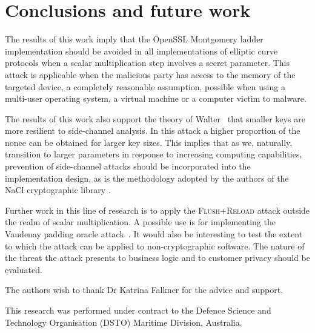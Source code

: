 \documentclass[twocolumn]{svjour3}
\newcommand{\starpar}[1]{\par{\footnotesize $\star$ \hl{#1}\par}}
\newcommand{\fl}{\textsc{Flu\-sh+\allowbreak Re\-load}\xspace}
\begin{document}
\section{Conclusions and future work}
The results of this work imply that the OpenSSL Montgomery ladder implementation should be avoided in 
all implementations of elliptic curve protocols when a scalar multiplication step involves a secret parameter. 
This attack is applicable when the malicious party has access to the memory of the targeted device, 
a completely reasonable assumption, possible when using a multi-user operating system, a virtual machine or a computer victim to malware. 

The results of this work also support the theory of Walter~\cite{walter04longer} that smaller keys are more resilient to side-channel analysis.
In this attack a higher proportion of the nonce can be obtained for larger key sizes. 
This implies that as we, naturally, transition to larger parameters in response to increasing computing capabilities, 
prevention of side-channel attacks should be incorporated into the implementation design, 
as is the methodology adopted by the authors of the NaCl cryptographic library \cite{dan-tan-peter}. 

Further work in this line of research is to apply the \fl attack outside the realm of scalar multiplication.
A possible use is for implementing the Vaudenay padding oracle attack~\cite{alfardan12plaintext,vaudenay02security}.
It would also be interesting to test the extent to which the attack can be applied to non-cryptographic software.
The nature of the threat the attack presents to business logic and to customer privacy should be evaluated.





\begin{acknowledgements}
The authors wish to thank Dr Katrina Falkner for the advice and support.

This research was performed under contract to the Defence
Science and Technology Organisation (DSTO) Maritime Division,
Australia.
\end{acknowledgements}




\end{document}
